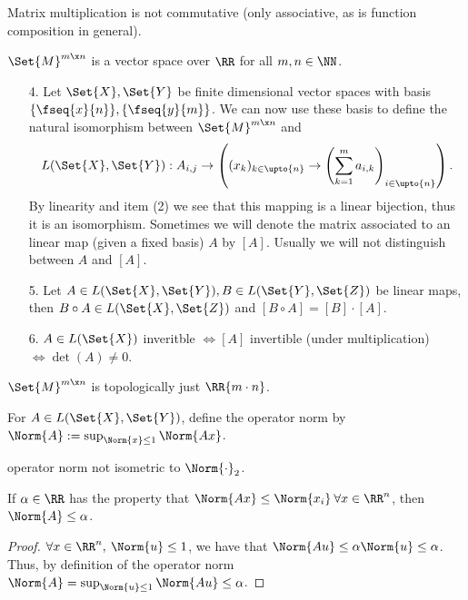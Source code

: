 \begin{rem}
 Matrix multiplication is not commutative (only associative, as is function composition in general).
\end{rem}
\begin{rem}
 $\Set{M}^{m\x n}$ is a vector space over $\RR$ for all $m,n\in\NN$.
\end{rem}
\begin{enumerate}
 \item[4.] Let $\Set{X}, \Set{Y}$ be finite dimensional vector spaces with basis $\{\fseq{x}{n}\}, \linebreak[4]\{\fseq{y}{m}\}$. We can now use these basis to define the natural isomorphism between $\Set{M}^{m\x n}$ and \[L(\Set{X},\Set{Y}): A_{i,j}\to \left((x_k)_{k\in\upto{n}}\to \left(\sum_{k=1}^{m}a_{i,k}\right)_{i\in\upto{n}}\right).\] By linearity and item (2) we see that this mapping is a linear bijection, thus it is an isomorphism. 
 Sometimes we will denote the matrix associated to an linear map (given a fixed basis) $A$ by $[A]$. Usually we will not distinguish between $A$ and $[A]$. 
 \item[5.] Let $A\in L(\Set{X},\Set{Y}), B\in L(\Set{Y},\Set{Z})$ be linear maps, then $B\circ A\in L(\Set{X},\Set{Z})$ and $[B\circ A]=[B]\cdot[A]$.
 \item[6.] $A\in L(\Set{X})$ inveritble $\Leftrightarrow [A]$ invertible (under multiplication) $\Leftrightarrow\det(A)\neq 0$. 
\end{enumerate}
\begin{rem}
	$\Set{M}^{m\x n}$ is topologically just $\RR{m\cdot n}$. 
\end{rem}
\begin{defn}
 For $A\in L(\Set{X},\Set{Y})$, define the operator norm by $\Norm{A}:=\sup_{\Norm{x}\leq 1}\Norm{A x}$.
\end{defn}
\begin{rem}
 operator norm not isometric to $\Norm{\cdot}_2$.
\end{rem}
\begin{lem}
 \label{lem:obvbndOpNorm}
 If $\alpha\in\RR$ has the property that $\Norm{A x}\leq \Norm{x_i}\:\forall x\in\RR^n$, then $\Norm{A}\leq \alpha$.
\end{lem}
\begin{proof}
 $\forall x\in\RR^n,\:\Norm{u}\leq 1$, we have that $\Norm{Au}\leq \alpha\Norm{u}\leq\alpha$. Thus, by definition of the operator norm $\Norm{A}=\sup_{\Norm{u}\leq 1}\Norm{Au}\leq \alpha$.
\end{proof}
